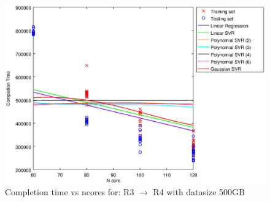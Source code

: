 
\begin {figure}[hbtp]
\centering
\includegraphics[width=\textwidth]{output/R3_R4_500_ALL_FEATURES/plot_R3_R4_500.eps}
\caption{Completion time vs ncores for: R3 $\rightarrow$ R4 with datasize 500GB}
\label{fig:coreonly_linear_R3_R4_500}
\end {figure}
